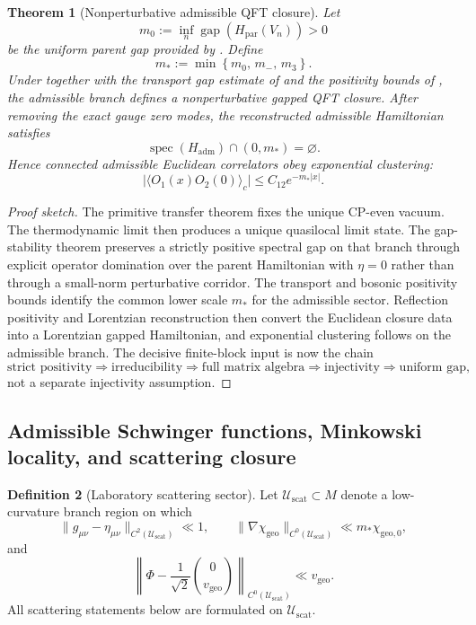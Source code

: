 \documentclass[11pt,a4paper]{article}
\newtheorem{theorem}{Theorem}[section]
\theoremstyle{definition}
\newtheorem{definition}[theorem]{Definition}
\theoremstyle{remark}
\newcommand{\chigeo}{\chi_{\mathrm{geo}}}
\newcommand{\chigeozero}{\chi_{\mathrm{geo},0}}
\newcommand{\vgeo}{v_{\mathrm{geo}}}
\begin{document}
\begin{theorem}[Nonperturbative admissible QFT closure]
\label{thm:nonperturbative-admissible-qft}
Let
\[
m_0:=\inf_n \operatorname{gap}(H_{\mathrm{par}}(V_n))>0
\]
be the uniform parent gap provided by . Define
\[
m_*:=\min\left\{m_0,\,m_-,\,m_3\right\}.
\]
Under 
together with the transport gap estimate of  and the positivity
bounds of , the admissible branch defines a nonperturbative
gapped QFT closure. After removing the exact gauge zero modes, the reconstructed admissible
Hamiltonian satisfies
\[
\operatorname{spec}(H_{\mathrm{adm}})\cap(0,m_*)=\varnothing.
\]
Hence connected admissible Euclidean correlators obey exponential clustering:
\[
\bigl|\langle O_1(x)O_2(0)\rangle_c\bigr|
\le
C_{12}e^{-m_*|x|}.
\]
\end{theorem}

\begin{proof}[Proof sketch]
The primitive transfer theorem fixes the unique CP-even vacuum. The thermodynamic limit then
produces a unique quasilocal limit state. The gap-stability theorem preserves a strictly positive
spectral gap on that branch through explicit operator domination over the parent Hamiltonian with
$\eta=0$ rather than through a small-norm perturbative corridor. The transport and bosonic
positivity bounds identify the common lower scale $m_*$ for the admissible sector. Reflection
positivity and Lorentzian reconstruction then convert the Euclidean closure data into a Lorentzian
gapped Hamiltonian, and exponential clustering follows on the admissible branch. The decisive
finite-block input is now the chain
\[
\text{strict positivity}\Rightarrow\text{irreducibility}\Rightarrow\text{full matrix algebra}
\Rightarrow\text{injectivity}\Rightarrow\text{uniform gap},
\]
not a separate injectivity assumption.
\end{proof}

\subsection{Admissible Schwinger functions, Minkowski locality, and scattering closure}

\begin{definition}[Laboratory scattering sector]
\label{def:laboratory-scattering-sector}
Let $\mathcal U_{\mathrm{scat}}\subset M$ denote a low-curvature branch region on which
\[
\|g_{\mu\nu}-\eta_{\mu\nu}\|_{C^2(\mathcal U_{\mathrm{scat}})}\ll 1,
\qquad
\|\nabla\chigeo\|_{C^0(\mathcal U_{\mathrm{scat}})}\ll m_*\chigeozero,
\]
and
\[
\left\|
\Phi-\frac{1}{\sqrt2}\binom{0}{\vgeo}
\right\|_{C^0(\mathcal U_{\mathrm{scat}})}
\ll
\vgeo.
\]
All scattering statements below are formulated on $\mathcal U_{\mathrm{scat}}$.
\end{definition}
\end{document}
